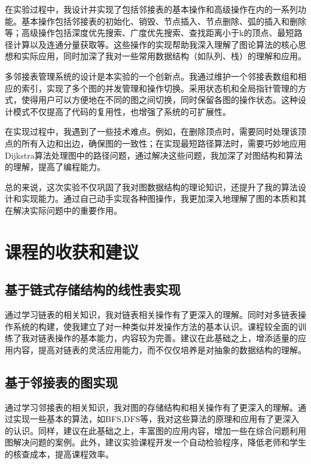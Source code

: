 \documentclass[supercite]{Experimental_Report}
\theoremstyle{definition}
\begin{document}
在实验过程中，我设计并实现了包括邻接表的基本操作和高级操作在内的一系列功能。基本操作包括邻接表的初始化、销毁、节点插入、节点删除、弧的插入和删除等；高级操作包括深度优先搜索、广度优先搜索、查找距离小于k的顶点、最短路径计算以及连通分量获取等。这些操作的实现帮助我深入理解了图论算法的核心思想和实际应用，同时加深了我对一些常用数据结构（如队列、栈）的理解和应用。

多邻接表管理系统的设计是本实验的一个创新点。我通过维护一个邻接表数组和相应的索引，实现了多个图的并发管理和操作切换。采用状态机和全局指针管理的方式，使得用户可以方便地在不同的图之间切换，同时保留各图的操作状态。这种设计模式不仅提高了代码的复用性，也增强了系统的可扩展性。

在实现过程中，我遇到了一些技术难点。例如，在删除顶点时，需要同时处理该顶点的所有入边和出边，确保图的一致性；在实现最短路径算法时，需要巧妙地应用Dijkstra算法处理图中的路径问题，通过解决这些问题，我加深了对图结构和算法的理解，提高了编程能力。

总的来说，这次实验不仅巩固了我对图数据结构的理论知识，还提升了我的算法设计和实现能力。通过自己动手实现各种图操作，我更加深入地理解了图的本质和其在解决实际问题中的重要作用。

\newpage

\section{课程的收获和建议}

\subsection{基于链式存储结构的线性表实现}

通过学习链表的相关知识，我对链表相关操作有了更深入的理解。同时对多链表操作系统的构建，使我建立了对一种类似并发操作方法的基本认识。课程较全面的训练了我对链表操作的基本能力，内容较为完善。建议在此基础之上，增添适量的应用内容，提高对链表的灵活应用能力，而不仅仅培养是对抽象的数据结构的理解。

\subsection{基于邻接表的图实现}

通过学习邻接表的相关知识，我对图的存储结构和相关操作有了更深入的理解。通过实现一些基本的算法，如BFS,DFS等，我对这些算法的原理和应用有了更深入的认识。同样，建议在此基础之上，丰富图的应用内容，增加一些在综合问题利用图解决问题的案例。此外，建议实验课程开发一个自动检验程序，降低老师和学生的核查成本，提高课程效率。
\end{document}
